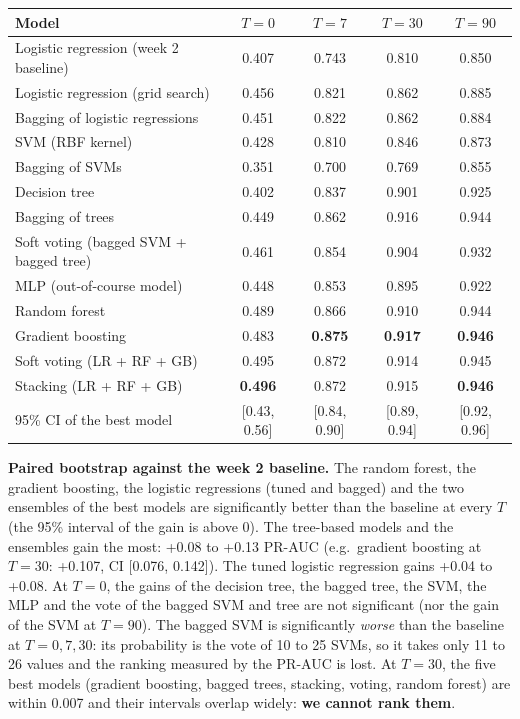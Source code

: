 \documentclass[11pt,a4paper]{article}
\begin{document}
\begin{center}
\small
\begin{tabular}{l c c c c}
\toprule
Model & $T = 0$ & $T = 7$ & $T = 30$ & $T = 90$ \\
\midrule
Logistic regression (week 2 baseline) & 0.407 & 0.743 & 0.810 & 0.850 \\
Logistic regression (grid search)     & 0.456 & 0.821 & 0.862 & 0.885 \\
Bagging of logistic regressions       & 0.451 & 0.822 & 0.862 & 0.884 \\
SVM (RBF kernel)                      & 0.428 & 0.810 & 0.846 & 0.873 \\
Bagging of SVMs                       & 0.351 & 0.700 & 0.769 & 0.855 \\
Decision tree                         & 0.402 & 0.837 & 0.901 & 0.925 \\
Bagging of trees                      & 0.449 & 0.862 & 0.916 & 0.944 \\
Soft voting (bagged SVM + bagged tree) & 0.461 & 0.854 & 0.904 & 0.932 \\
MLP (out-of-course model)             & 0.448 & 0.853 & 0.895 & 0.922 \\
Random forest                         & 0.489 & 0.866 & 0.910 & 0.944 \\
Gradient boosting                     & 0.483 & \textbf{0.875} & \textbf{0.917} & \textbf{0.946} \\
Soft voting (LR + RF + GB)            & 0.495 & 0.872 & 0.914 & 0.945 \\
Stacking (LR + RF + GB)               & \textbf{0.496} & 0.872 & 0.915 & \textbf{0.946} \\
\midrule
95\% CI of the best model             & [0.43, 0.56] & [0.84, 0.90] & [0.89, 0.94] & [0.92, 0.96] \\
\bottomrule
\end{tabular}
\end{center}

\textbf{Paired bootstrap against the week 2 baseline.} The random forest, the gradient boosting, the
logistic regressions (tuned and bagged) and the two ensembles of the best models are significantly better
than the baseline at every $T$ (the 95\% interval of the gain is above 0). The tree-based models and the
ensembles gain the most: +0.08 to +0.13 PR-AUC (e.g.\ gradient boosting at $T = 30$: +0.107,
CI [0.076, 0.142]). The tuned logistic regression gains +0.04 to +0.08. At $T = 0$, the gains of the
decision tree, the bagged tree, the SVM, the MLP and the vote of the bagged SVM and tree are not
significant (nor the gain of the SVM at $T = 90$). The bagged SVM is significantly
\emph{worse} than the baseline at $T = 0, 7, 30$: its probability is the vote of 10 to 25 SVMs, so it takes
only 11 to 26 values and the ranking measured by the PR-AUC is lost. At $T = 30$, the five best models
(gradient boosting, bagged trees, stacking, voting, random forest) are within 0.007 and their intervals
overlap widely: \textbf{we cannot rank them}.
\end{document}
